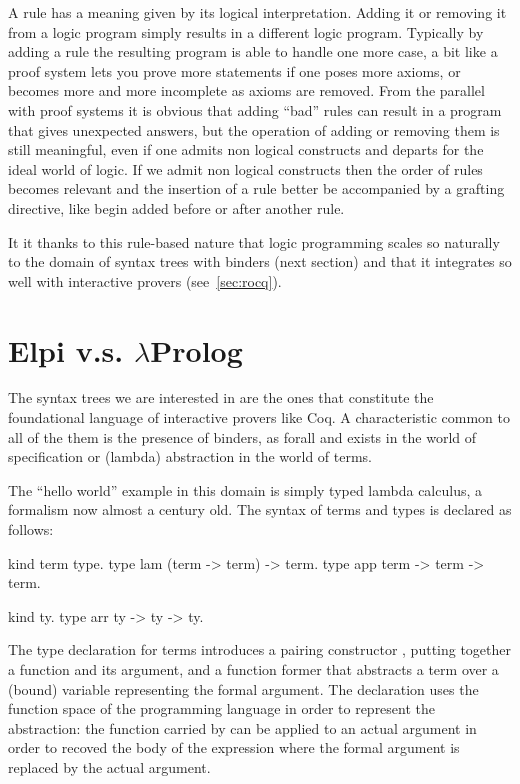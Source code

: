 \documentclass[a4paper, 11pt]{book}
\begin{document}
A rule has a meaning given by its logical interpretation. Adding it or removing
it from a logic program simply results in a different logic program. Typically
by adding a rule the resulting program is able to handle one more case,
a bit like a proof system lets you prove more statements if one poses
more axioms, or becomes more and more incomplete as axioms are removed.
From the parallel with proof systems it is obvious that adding ``bad'' rules
can result in a program that gives unexpected answers, but the operation
of adding or removing them is still meaningful, even if one admits non logical
constructs and departs for the ideal world of logic.
If we admit non logical
constructs then the order of rules becomes relevant and the insertion of a
rule better be accompanied by a grafting directive, like begin added before
or after another rule.

It it thanks to this rule-based nature that logic programming scales so
naturally to the domain of syntax trees with binders (next section)
and that it integrates so well with interactive provers (see~\ref{sec:rocq}).

\section{Elpi v.s. $\lambda$Prolog}

The syntax trees we are interested in are the ones that constitute
the foundational language of interactive provers like Coq. A characteristic common
to all of the them is the presence of binders, as forall and exists in
the world of specification or (lambda) abstraction in the world of terms.

The ``hello world'' example in this domain is simply typed lambda calculus,
a formalism now almost a century old. The syntax of terms and types
is declared as follows:

\begin{elpicode}
kind term type.
type lam (term -> term) -> term.
type app term -> term -> term.

kind ty.
type arr ty -> ty -> ty.
\end{elpicode}

The type declaration for terms introduces a pairing constructor ,
putting together a function and its argument, and a function former
 that abstracts a term over a (bound) variable representing the
formal argument. The declaration uses the function space of
the programming language in order to represent the abstraction:
the function carried by  can be applied to an actual argument in order
to recoved the body of the expression where the formal argument is
replaced by the actual argument.
\end{document}
